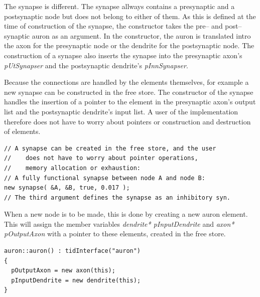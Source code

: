 	The synapse is different. 
	The synapse allways contains a presynaptic and a postsynaptic node but does not belong to either of them.
	As this is defined at the time of construction of the synapse, the constructor takes the pre-- and post-- synaptic auron as an argument. 
	In the constructor, the auron is translated intro the axon for the presynaptic node or the dendrite for the postsynaptic node.
	The construction of a synapse also inserts the synapse into the presynaptic axon's \emph{pUtSynapser} and the postsynaptic dendrite's \emph{pInnSynapser}. %
	
	Because the connections are handled by the elements themselves, for example a new synapse can be constructed in the free store. 
	The constructor of the synapse handles the insertion of a pointer to the element in the presynaptic axon's output list and the postsynaptic dendrite's input list.
	A user of the implementation therefore does not have to worry about pointers or construction and destruction of elements.
\begin{lstlisting}
// A synapse can be created in the free store, and the user 
//    does not have to worry about pointer operations, 
// 	  memory allocation or exhaustion:
// A fully functional synapse between node A and node B:
new synapse( &A, &B, true, 0.017 ); 
// The third argument defines the synapse as an inhibitory syn. 
\end{lstlisting}

	When a new node is to be made, this is done by creating a new auron element.
	This will assign the member variables \emph{dendrite* pInputDendrite} and \emph{axon* pOutputAxon} with a pointer to these elements, created in the free store.

\begin{lstlisting}
auron::auron() : tidInterface("auron")
{
  pOutputAxon = new axon(this);         
  pInputDendrite = new dendrite(this);
}
\end{lstlisting}

